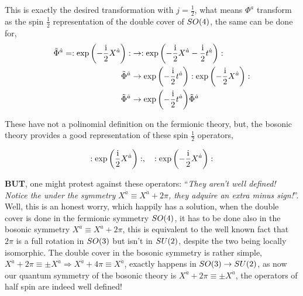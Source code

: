 This is exactly the desired transformation with $j=\frac12$, what means $\Phi^{\dot a}$ transform as the spin $\frac12$ representation 
of the double cover of $SO\qty(4)$, the same can be done for,
\begin{align*}
    {\tilde\Phi}^{\dot a}=:\exp\qty(-\frac{\textnormal{i}}2 X^{\dot a}):&\rightarrow:\exp\qty(-\frac{\textnormal{i}}2 X^{\dot a}-\frac{\textnormal{i}}2 t^{\dot a}):\\
    {\tilde\Phi}^{\dot a}&\rightarrow\exp\qty(-\frac{\textnormal{i}}2 t^{\dot a}):\exp\qty(-\frac{\textnormal{i}}2 X^{\dot a}):\\
    {\tilde\Phi}^{\dot a}&\rightarrow\exp\qty(-\frac{\textnormal{i}}2 t^{\dot a}){\tilde\Phi}^{\dot a}
\end{align*}

These have not a polinomial definition on the fermionic theory, but, the bosonic theory provides a good representation of these spin $\frac12$ operators,

\begin{align*}
    \cnord{\exp\qty(\frac\im2 X^{\dot a})},\ \ \ \cnord{\exp\qty(-\frac\im2 X^{\dot a})}
\end{align*}

\textbf{BUT}, one might protest against these operators: ``\textit{They aren't well defined! Notice the under the symmetry }$X^{\dot a}\equiv X^{\dot a}+2\pi$\textit{, they adquire an extra minus sign!}''. 
Well, this is an honest worry, which happily has a solution, when the double cover is done in the fermionic symmetry $SO\qty(4)$, 
it has to be done also in the bosonic symmetry $X^{\dot a}\equiv X^{\dot a}+2\pi$, this is equivalent to the well known fact that $2\pi$ is a full 
rotation in $SO\qty(3)$ but isn't in $SU\qty(2)$, despite the two being locally isomorphic. The double cover in the bosonic 
symmetry is rather simple, $X^{\dot a}+2\pi\equiv\pm X^{\dot a}\Rightarrow X^{\dot a}+4\pi\equiv X^{\dot a}$, exactly happens in $SO\qty(3)\rightarrow SU\qty(2)$, 
as now our quantum symmetry of the bosonic theory is $X^{\dot a}+2\pi\equiv\pm X^{\dot a}$, the operators of half spin are indeed well defined!